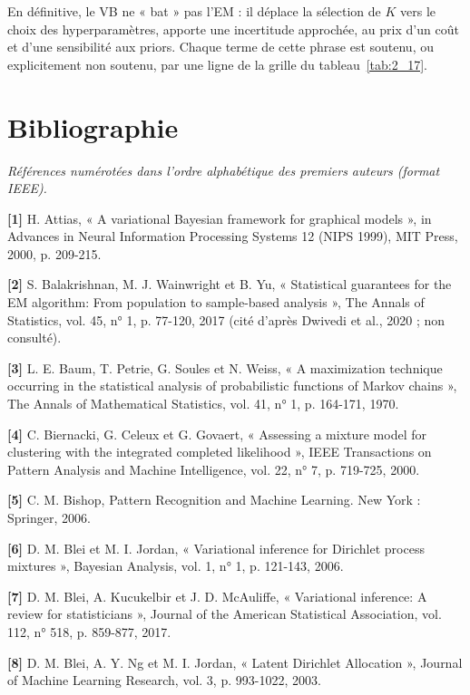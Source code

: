 En définitive, le VB ne « bat » pas l'EM : il déplace la sélection de $K$ vers le choix des hyperparamètres, apporte une incertitude approchée, au prix d'un coût et d'une sensibilité aux priors. Chaque terme de cette phrase est soutenu, ou explicitement non soutenu, par une ligne de la grille du tableau~\ref{tab:2_17}.


\chapter*{Bibliographie}
\emph{Références numérotées dans l’ordre alphabétique des premiers auteurs (format IEEE).}

\textbf{[1]  }H. Attias, « A variational Bayesian framework for graphical models », in Advances in Neural Information Processing Systems 12 (NIPS 1999), MIT Press, 2000, p. 209-215.

\textbf{[2]  }S. Balakrishnan, M. J. Wainwright et B. Yu, « Statistical guarantees for the EM algorithm: From population to sample-based analysis », The Annals of Statistics, vol. 45, n° 1, p. 77-120, 2017 (cité d'après Dwivedi et al., 2020 ; non consulté).

\textbf{[3]  }L. E. Baum, T. Petrie, G. Soules et N. Weiss, « A maximization technique occurring in the statistical analysis of probabilistic functions of Markov chains », The Annals of Mathematical Statistics, vol. 41, n° 1, p. 164-171, 1970.

\textbf{[4]  }C. Biernacki, G. Celeux et G. Govaert, « Assessing a mixture model for clustering with the integrated completed likelihood », IEEE Transactions on Pattern Analysis and Machine Intelligence, vol. 22, n° 7, p. 719-725, 2000.

\textbf{[5]  }C. M. Bishop, Pattern Recognition and Machine Learning. New York : Springer, 2006.

\textbf{[6]  }D. M. Blei et M. I. Jordan, « Variational inference for Dirichlet process mixtures », Bayesian Analysis, vol. 1, n° 1, p. 121-143, 2006.

\textbf{[7]  }D. M. Blei, A. Kucukelbir et J. D. McAuliffe, « Variational inference: A review for statisticians », Journal of the American Statistical Association, vol. 112, n° 518, p. 859-877, 2017.

\textbf{[8]  }D. M. Blei, A. Y. Ng et M. I. Jordan, « Latent Dirichlet Allocation », Journal of Machine Learning Research, vol. 3, p. 993-1022, 2003.

